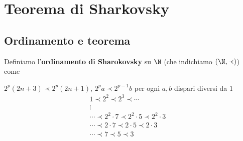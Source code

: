 \section{Teorema di Sharkovsky}
\subsection{Ordinamento e teorema}
\begin{definition}
Definiamo l'\textbf{ordinamento di Sharokovsky} su $\N$ (che indichiamo $(\N,\prec)$) come

$2^p(2n+3)\prec 2^p(2n+1)$, $2^pa\prec 2^{p-1}b$ per ogni $a,b$ dispari diversi da $1$
\begin{align*}
1\prec2^2\prec 2^3\prec\cdots&\\
\vdots&\\
\cdots\prec2^2\cdot7\prec2^2\cdot5\prec2^2\cdot3&\\
\cdots\prec2\cdot7\prec2\cdot5\prec2\cdot3&\\
\cdots\prec7\prec5\prec3&
\end{align*}
\end{definition}

